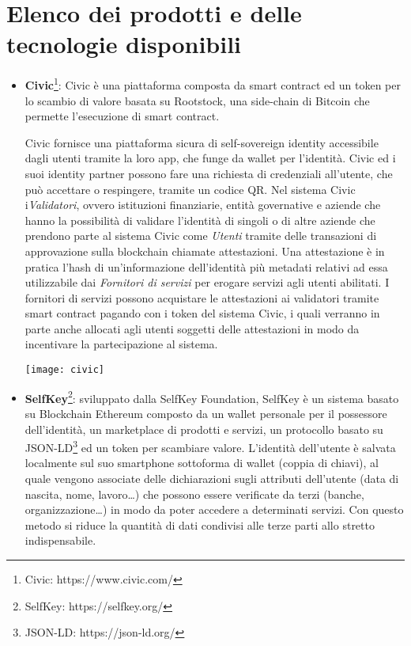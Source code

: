 \section{Elenco dei prodotti e delle tecnologie disponibili}

\begin{itemize}
  \item \textbf{Civic}\footnote{Civic: https://www.civic.com/}:
  Civic è una piattaforma composta da smart contract ed un token per lo scambio
  di valore basata su Rootstock, una side-chain di Bitcoin che permette l’esecuzione di smart contract.

  Civic fornisce una piattaforma sicura di self-sovereign identity accessibile dagli utenti tramite
  la loro app, che funge da wallet per l’identità.
  Civic ed i suoi identity partner possono fare una richiesta di credenziali all’utente, che può 
  accettare o respingere, tramite un codice QR.
  Nel sistema Civic i\emph{Validatori}, ovvero istituzioni finanziarie, entità governative e aziende che hanno la possibilità
  di validare l’identità di singoli o di altre aziende che prendono parte al sistema
  Civic come \emph{Utenti} tramite delle transazioni di approvazione sulla blockchain chiamate attestazioni.
  Una attestazione è in pratica l’hash di un’informazione dell’identità più metadati relativi ad essa
  utilizzabile dai \emph{Fornitori di servizi} per erogare servizi agli utenti abilitati. I fornitori di servizi possono
  acquistare le attestazioni ai validatori tramite smart contract pagando con i token del sistema Civic,
  i quali verranno in parte anche allocati agli utenti soggetti delle attestazioni in modo
  da incentivare la partecipazione al sistema.

  \begin{center}
    \texttt{[image: civic]}
  \end{center}

  \item \textbf{SelfKey}\footnote{SelfKey: https://selfkey.org/}:
  sviluppato dalla SelfKey Foundation, SelfKey è un sistema basato su Blockchain Ethereum composto
  da un wallet personale per il possessore dell’identità, un marketplace di prodotti e servizi,
  un protocollo basato su JSON-LD\footnote{JSON-LD: https://json-ld.org/} ed un token per scambiare valore.
  L’identità dell’utente è salvata localmente sul suo smartphone sottoforma di wallet (coppia di chiavi),
  al quale vengono associate delle dichiarazioni sugli attributi dell’utente (data di nascita, nome, lavoro…) 
  che possono essere verificate da terzi (banche, organizzazione…)
  in modo da poter accedere a determinati servizi. Con questo metodo si riduce
  la quantità di dati condivisi alle terze parti allo stretto indispensabile. 
  

\end{itemize}
